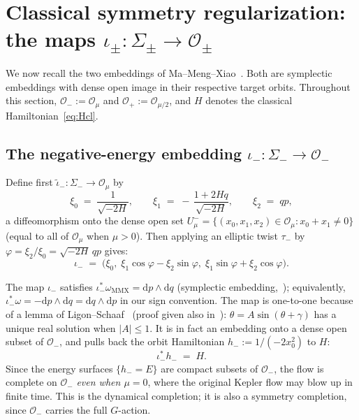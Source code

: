 \documentclass[11pt]{article}
\theoremstyle{plain}
\theoremstyle{definition}
\theoremstyle{remark}
\newcommand{\OO}{\mathcal{O}}
\begin{document}
\section{Classical symmetry regularization: the maps
  \texorpdfstring{$\iota_{\pm}:\Sigma_{\pm}\to\OO_{\pm}$}{iota±:Σ±→O±}}\label{sec:classical-reg}

We now recall the two embeddings of Ma--Meng--Xiao~\cite{MMX2025}. Both are symplectic embeddings with dense open image in their respective target orbits. Throughout
this section, $\OO_{-}:=\OO_{\mu}$ and $\OO_{+}:=\OO_{\mu/2}$, and $H$ denotes
the classical Hamiltonian~\eqref{eq:Hcl}.

\subsection{The negative-energy embedding
  \texorpdfstring{$\iota_{-}:\Sigma_{-}\to\OO_{-}$}{iota\_-}}

Define first $\tilde\iota_{-}:\Sigma_{-}\to\OO_{\mu}$ by
\begin{equation}\label{eq:tildeiotaminus}
  \xi_{0}\;=\;\frac{1}{\sqrt{-2H}},\qquad
  \xi_{1}\;=\;-\,\frac{1+2Hq}{\sqrt{-2H}},\qquad
  \xi_{2}\;=\;qp,
\end{equation}
a diffeomorphism onto the dense open set
$U^{-}_{\mu}=\{(x_{0},x_{1},x_{2})\in\OO_{\mu}\colon x_{0}+x_{1}\neq 0\}$
(equal to all of $\OO_{\mu}$ when $\mu>0$). Then applying an elliptic twist $\tau_{-}$ by
$\varphi=\xi_{2}/\xi_{0}=\sqrt{-2H}\,qp$ gives:
\begin{equation}\label{eq:iotaminus}
  \iota_{-}\;=\;\bigl(\xi_{0},\;\xi_{1}\cos\varphi-\xi_{2}\sin\varphi,\;\xi_{1}\sin\varphi+\xi_{2}\cos\varphi\bigr).
\end{equation}

The map $\iota_{-}$ satisfies $\iota_{-}^{*}\omega_{\text{MMX}}=\mathrm{d}p\wedge \mathrm{d}q$ (symplectic
embedding,~\cite[Prop.~1]{MMX2025}); equivalently,
$\iota_{-}^{*}\omega=-\mathrm{d}p\wedge \mathrm{d}q=\mathrm{d}q\wedge \mathrm{d}p$ in our sign convention.
The map is one-to-one because of a lemma of Ligon--Schaaf~\cite{LigonSchaaf1976}
(proof given also in~\cite{MMX2025}): $\theta=A\sin(\theta+\gamma)$ has a unique real
solution when $|A|\le 1$. It is in fact an embedding onto a dense open
subset of $\OO_{-}$, and pulls back the orbit Hamiltonian $h_{-}:=1/(-2x_{0}^{2})$
to $H$:
\begin{equation}\label{eq:pullbackminus}
  \boxed{\;\iota_{-}^{*}h_{-}\;=\;H.\;}
\end{equation}
Since the energy surfaces $\{h_{-}=E\}$ are compact subsets of $\OO_{-}$, the
flow is complete on $\OO_{-}$ \emph{even when $\mu=0$}, where the original
Kepler flow may blow up in finite time. This is the dynamical completion; it is also a symmetry completion, since $\OO_{-}$ carries the full $G$-action.
\end{document}
